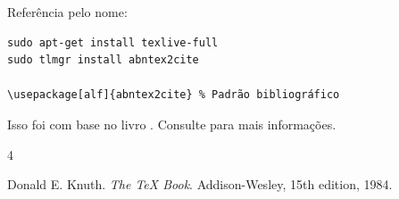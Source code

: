 \documentclass[a4paper,11pt]{article}
\begin{document}
Referência pelo nome:
\begin{lstlisting}[]
sudo apt-get install texlive-full
sudo tlmgr install abntex2cite

\usepackage[alf]{abntex2cite} % Padrão bibliográfico
\end{lstlisting}

Isso foi com base no livro \cite{knuth}.  Consulte  para mais informações.
\begin{thebibliography}{4}
	
	
	Donald E. Knuth.
	\textit{The \TeX{} Book}.
	Addison-Wesley, 15th edition, 1984.
\end{thebibliography}
\end{document}
